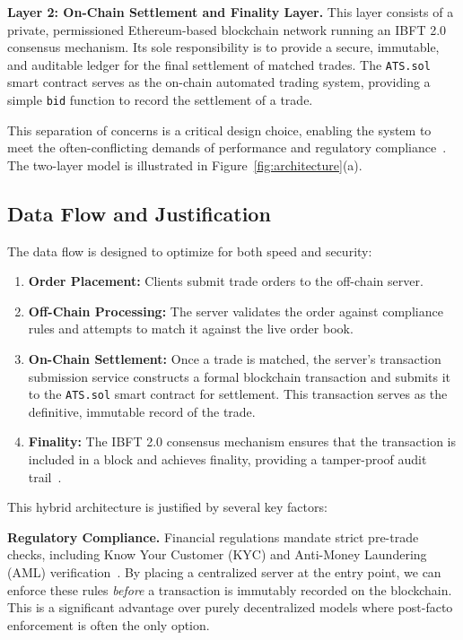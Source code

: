 \textbf{Layer 2: On-Chain Settlement and Finality Layer.} This layer consists of a private, permissioned Ethereum-based blockchain network running an IBFT 2.0 consensus mechanism. Its sole responsibility is to provide a secure, immutable, and auditable ledger for the final settlement of matched trades. The \texttt{ATS.sol} smart contract serves as the on-chain automated trading system, providing a simple \texttt{bid} function to record the settlement of a trade.

This separation of concerns is a critical design choice, enabling the system to meet the often-conflicting demands of performance and regulatory compliance~\cite{jamithireddy2025hybrid}. The two-layer model is illustrated in Figure~\ref{fig:architecture}(a).

\subsection{Data Flow and Justification}

The data flow is designed to optimize for both speed and security:

\begin{enumerate}
    \item \textbf{Order Placement:} Clients submit trade orders to the off-chain server.
    \item \textbf{Off-Chain Processing:} The server validates the order against compliance rules and attempts to match it against the live order book.
    \item \textbf{On-Chain Settlement:} Once a trade is matched, the server's transaction submission service constructs a formal blockchain transaction and submits it to the \texttt{ATS.sol} smart contract for settlement. This transaction serves as the definitive, immutable record of the trade.
    \item \textbf{Finality:} The IBFT 2.0 consensus mechanism ensures that the transaction is included in a block and achieves finality, providing a tamper-proof audit trail~\cite{kuhn2019rethinking}.
\end{enumerate}

This hybrid architecture is justified by several key factors:

\textbf{Regulatory Compliance.} Financial regulations mandate strict pre-trade checks, including Know Your Customer (KYC) and Anti-Money Laundering (AML) verification~\cite{fincen2024kyc}. By placing a centralized server at the entry point, we can enforce these rules \textit{before} a transaction is immutably recorded on the blockchain. This is a significant advantage over purely decentralized models where post-facto enforcement is often the only option.

